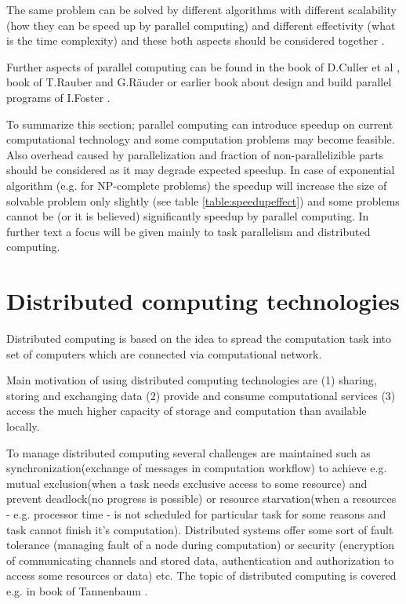 The same problem can be solved by different algorithms with different scalability (how they can be speed up by parallel computing) and different effectivity (what is the time complexity) and these both aspects should be considered together \cite{Madden2012}. 

Further aspects of parallel computing can be found in the book of D.Culler et al  \cite{Culer1998}, book of T.Rauber and G.Räuder \cite{Rauber2013} or earlier book about design and build parallel programs of I.Foster  \cite{Foster1995}.

To summarize this section; parallel computing can introduce speedup on current computational technology and some computation problems may become feasible.
Also overhead caused by parallelization and fraction of non-parallelizible parts should be considered as it may degrade expected speedup.
In case of exponential algorithm (e.g. for NP-complete problems) the speedup will increase the size of solvable problem only slightly (see table \ref{table:speedupeffect}) and some problems cannot be (or it is believed) significantly speedup by parallel computing. 
In further text a focus will be given mainly to task parallelism and distributed computing. 

\section{Distributed computing technologies}
\label{sec:distributed}

Distributed computing is based on the idea to spread the computation task into set of computers which are connected via computational network.

Main motivation of using distributed computing technologies are (1) sharing, storing and exchanging data (2) provide and consume computational services (3) access the much higher capacity of storage and computation than available locally.

To manage distributed computing several challenges are maintained such as synchronization(exchange of messages in computation workflow) to achieve e.g. mutual exclusion(when a task needs exclusive access to some resource) and prevent deadlock(no progress is possible) or resource starvation(when a resources - e.g. processor time - is not scheduled for particular task for some reasons and task cannot finish it's computation). Distributed systems offer some sort of fault tolerance (managing fault of a node during computation) or security (encryption of communicating channels and stored data, authentication and authorization to access some resources or data) etc. The topic of distributed computing is covered e.g. in book of Tannenbaum \cite{Tanenbaum2007}. 

